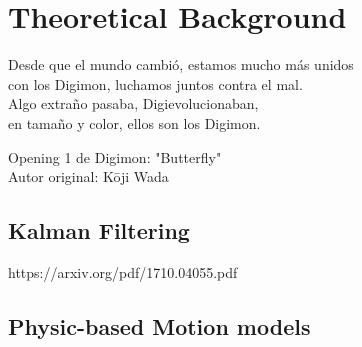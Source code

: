 % 
% 
% 
% 
% 
% 
% 

\chapter{Theoretical Background}
\label{cha:theoretical_background}

\begin{FraseCelebre}
	\begin{Frase}
		Desde que el mundo cambió, estamos mucho más unidos \\
		con los Digimon, luchamos juntos contra el mal. \\ 

		Algo extraño pasaba, Digievolucionaban, \\
		en tamaño y color, ellos son los Digimon. \\
	\end{Frase}
	\begin{Fuente}
		Opening 1 de Digimon: "Butterfly" \\
		Autor original: Kōji Wada
	\end{Fuente}
\end{FraseCelebre}

\section{Kalman Filtering}
\label{sec:3_kf}

https://arxiv.org/pdf/1710.04055.pdf

\section{Physic-based Motion models}

